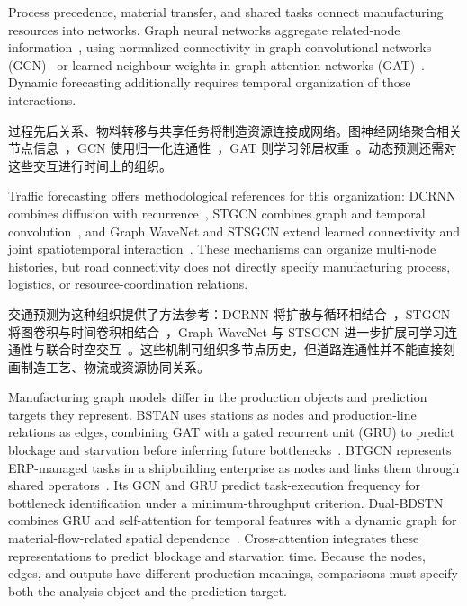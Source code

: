 \documentclass[a4paper,fleqn]{cas-dc}
\newcommand{\zhpara}[1]{%
  \par\begingroup\small\color{black!72}\noindent #1\par\endgroup}
\begin{document}
Process precedence, material transfer, and shared tasks connect manufacturing resources into networks. Graph neural networks aggregate related-node information~\cite{wu2021gnn}, using normalized connectivity in graph convolutional networks (GCN)~\cite{kipf2017gcn} or learned neighbour weights in graph attention networks (GAT)~\cite{velickovic2018gat}. Dynamic forecasting additionally requires temporal organization of those interactions.

\zhpara{过程先后关系、物料转移与共享任务将制造资源连接成网络。图神经网络聚合相关节点信息~\cite{wu2021gnn}，GCN 使用归一化连通性~\cite{kipf2017gcn}，GAT 则学习邻居权重~\cite{velickovic2018gat}。动态预测还需对这些交互进行时间上的组织。}


Traffic forecasting offers methodological references for this organization: DCRNN combines diffusion with recurrence~\cite{li2018dcrnn}, STGCN combines graph and temporal convolution~\cite{yu2018stgcn}, and Graph WaveNet and STSGCN extend learned connectivity and joint spatiotemporal interaction~\cite{wu2019graphwavenet,song2020stsgcn}. These mechanisms can organize multi-node histories, but road connectivity does not directly specify manufacturing process, logistics, or resource-coordination relations.

\zhpara{交通预测为这种组织提供了方法参考：DCRNN 将扩散与循环相结合~\cite{li2018dcrnn}，STGCN 将图卷积与时间卷积相结合~\cite{yu2018stgcn}，Graph WaveNet 与 STSGCN 进一步扩展可学习连通性与联合时空交互~\cite{wu2019graphwavenet,song2020stsgcn}。这些机制可组织多节点历史，但道路连通性并不能直接刻画制造工艺、物流或资源协同关系。}


Manufacturing graph models differ in the production objects and prediction targets they represent. BSTAN uses stations as nodes and production-line relations as edges, combining GAT with a gated recurrent unit (GRU) to predict blockage and starvation before inferring future bottlenecks~\cite{lai2023bstan}. BTGCN represents ERP-managed tasks in a shipbuilding enterprise as nodes and links them through shared operators~\cite{yin2025btgcn}. Its GCN and GRU predict task-execution frequency for bottleneck identification under a minimum-throughput criterion. Dual-BDSTN combines GRU and self-attention for temporal features with a dynamic graph for material-flow-related spatial dependence~\cite{cen2025dstnn}. Cross-attention integrates these representations to predict blockage and starvation time. Because the nodes, edges, and outputs have different production meanings, comparisons must specify both the analysis object and the prediction target.
\end{document}
